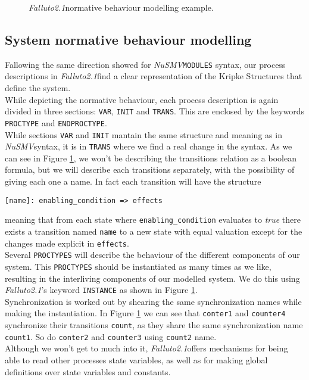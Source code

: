 \documentclass[12pt]{article}
\newcommand{\nusmv}{\mbox{\textit{NuSMV}}}
\newcommand{\falluto}{\mbox{\textit{Falluto2.1}}}
\begin{document}
\begin{figure}[h]
  \centering
  \theverbbox
  \caption{\falluto normative behaviour modelling example.}
  \label{example}
\end{figure}

\subsection{System normative behaviour modelling}
Fallowing the same direction showed for \nusmv \texttt{MODULES} syntax, our process descriptions in \falluto find a clear representation of the Kripke Structures that define the system.\\
While depicting the normative behaviour, each process description is again divided in three sections: \texttt{VAR}, \texttt{INIT} and \texttt{TRANS}. This are enclosed by the keywords \texttt{PROCTYPE} and \texttt{ENDPROCTYPE}.\\
While sections \texttt{VAR} and \texttt{INIT} mantain the same structure and meaning as in \nusmv syntax, it is in \texttt{TRANS} where we find a real change in the syntax. As we can see in Figure \ref{example}, we won't be describing the transitions relation as a boolean formula, but we will describe each transitions separately, with the possibility of giving each one a name. In fact each transition will have the structure
\begin{center}
\texttt{[name]: enabling\_condition => effects}
\end{center}
meaning that from each state where \texttt{enabling\_condition} evaluates to \textit{true} there exists a transition named \texttt{name} to a new state with equal valuation except for the changes made explicit in \texttt{effects}.\\
Several \texttt{PROCTYPES} will describe the behaviour of the different components of our system. This \texttt{PROCTYPES} should be instantiated as many times as we like, resulting in the interliving components of our modelled system. We do this using \falluto's keyword \texttt{INSTANCE} as shown in Figure \ref{example}.\\
Synchronization is worked out by shearing the same synchronization names while making the instantiation. In Figure \ref{example} we can see that \texttt{conter1} and \texttt{counter4} synchronize their transitions \texttt{count}, as they share the same synchronization name \texttt{count1}. So do \texttt{conter2} and \texttt{counter3} using \texttt{count2} name.\\
Although we won't get to much into it, \falluto offers mechanisms for being able to read other processes state variables, as well as for making global definitions over state variables and constants.
\end{document}
